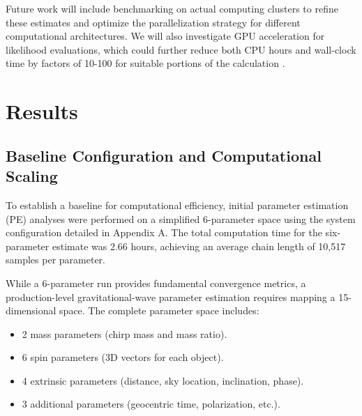 \documentclass[12pt]{article}
\begin{document}
Future work will include benchmarking on actual computing clusters to refine these estimates and optimize the parallelization strategy for different computational architectures. We will also investigate GPU acceleration for likelihood evaluations, which could further reduce both CPU hours and wall-clock time by factors of 10-100 for suitable portions of the calculation \cite{Bilby: A user-friendly}.

\section{Results}
\label{sec:results}

\subsection{Baseline Configuration and Computational Scaling}
\label{sec:baseline}
To establish a baseline for computational efficiency, initial parameter estimation (PE) analyses were performed on a simplified 6-parameter space using the system configuration detailed in Appendix A. The total computation time for the six-parameter estimate was 2.66 hours, achieving an average chain length of 10,517 samples per parameter.

While a 6-parameter run provides fundamental convergence metrics, a production-level gravitational-wave parameter estimation requires mapping a 15-dimensional space. The complete parameter space includes:
\begin{itemize}
    \item 2 mass parameters (chirp mass and mass ratio).
    \item 6 spin parameters (3D vectors for each object).
    \item 4 extrinsic parameters (distance, sky location, inclination, phase).
    \item 3 additional parameters (geocentric time, polarization, etc.).
\end{itemize}
\end{document}
